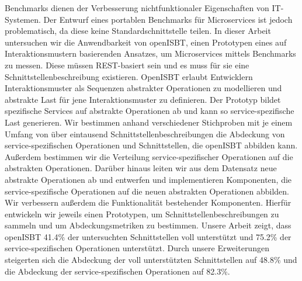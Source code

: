 Benchmarks dienen der Verbesserung nichtfunktionaler Eigenschaften von IT-Systemen. Der Entwurf eines portablen Benchmarks für Microservices ist jedoch problematisch, da diese keine Standardschnittstelle teilen. 
In dieser Arbeit untersuchen wir die Anwendbarkeit von openISBT, einen Prototypen eines auf Interaktionsmustern basierenden Ansatzes, um Microservices mittels Benchmarks zu messen. Diese müssen REST-basiert sein und es muss für sie eine Schnittstellenbeschreibung existieren.
OpenISBT erlaubt Entwicklern Interaktionsmuster als Sequenzen abstrakter Operationen zu modellieren und abstrakte Last für jene Interaktionsmuster zu definieren. Der Prototyp bildet spezifische Services auf abstrakte Operationen ab und kann so service-spezifische Last generieren.
Wir bestimmen anhand verschiedener Stichproben mit je einem Umfang von über eintausend Schnittstellenbeschreibungen die Abdeckung von service-spezifischen Operationen und Schnittstellen, die openISBT abbilden kann. Außerdem bestimmen wir die Verteilung service-spezifischer Operationen auf die abstrakten Operationen. 
Darüber hinaus leiten wir aus dem Datensatz neue abstrakte Operationen ab und entwerfen und implementieren Komponenten, die service-spezifische Operationen auf die neuen abstrakten Operationen abbilden. Wir verbessern außerdem die Funktionalität bestehender Komponenten. 
Hierfür entwickeln wir jeweils einen Prototypen, um Schnittstellenbeschreibungen zu sammeln und um Abdeckungsmetriken zu bestimmen. 
Unsere Arbeit zeigt, dass openISBT 41.4\% der untersuchten Schnittstellen voll unterstützt und  75.2\% der service-spezifischen Operationen unterstützt. Durch unsere Erweiterungen steigerten sich die Abdeckung der voll unterstützten Schnittstellen auf 48.8\% und die Abdeckung der service-spezifischen Operationen auf 82.3\%.
